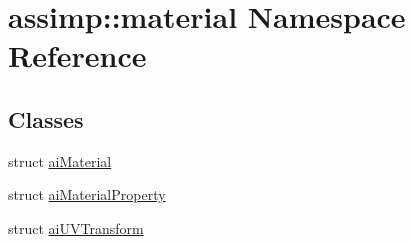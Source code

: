 \hypertarget{namespaceassimp_1_1material}{\section{assimp\+:\+:material Namespace Reference}
\label{namespaceassimp_1_1material}
}
\subsection*{Classes}
\begin{DoxyCompactItemize}
\item 
struct \hyperlink{structassimp_1_1material_1_1ai_material}{ai\+Material}
\item 
struct \hyperlink{structassimp_1_1material_1_1ai_material_property}{ai\+Material\+Property}
\item 
struct \hyperlink{structassimp_1_1material_1_1ai_u_v_transform}{ai\+U\+V\+Transform}
\end{DoxyCompactItemize}
